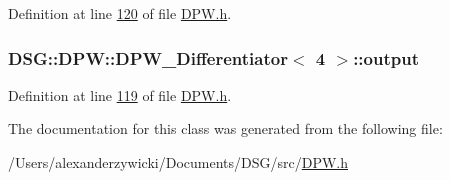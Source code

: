 Definition at line \hyperlink{_d_p_w_8h_source_l00120}{120} of file \hyperlink{_d_p_w_8h_source}{D\+P\+W.\+h}.

\hypertarget{class_d_s_g_1_1_d_p_w_1_1_d_p_w___differentiator_3_014_01_4_a5fd7e2dc19c470cacb8e23942c1afdbb}{
\subsubsection[{output}]{ {\bf D\+S\+G\+::\+D\+P\+W\+::\+D\+P\+W\+\_\+\+Differentiator}$<$ 4 $>$\+::output\hspace{0.3cm}{\ttfamily [protected]}}}\label{class_d_s_g_1_1_d_p_w_1_1_d_p_w___differentiator_3_014_01_4_a5fd7e2dc19c470cacb8e23942c1afdbb}


Definition at line \hyperlink{_d_p_w_8h_source_l00119}{119} of file \hyperlink{_d_p_w_8h_source}{D\+P\+W.\+h}.



The documentation for this class was generated from the following file\+:\begin{DoxyCompactItemize}
\item 
/\+Users/alexanderzywicki/\+Documents/\+D\+S\+G/src/\hyperlink{_d_p_w_8h}{D\+P\+W.\+h}\end{DoxyCompactItemize}
